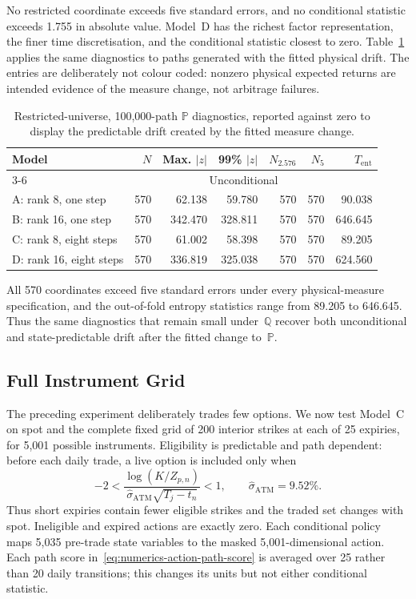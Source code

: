 \documentclass[11pt]{article}
\newcommand{\Q}{\mathbb Q}
\newcommand{\PP}{\mathbb P}
\newcommand{\abs}[1]{\lvert #1\rvert}
\theoremstyle{plain}
\theoremstyle{definition}
\theoremstyle{remark}
\begin{document}
No restricted coordinate exceeds five standard errors, and no conditional
statistic exceeds 1.755 in absolute value.  Model~D has the richest
factor representation, the finer time discretisation, and the conditional
statistic closest to zero.  Table~\ref{tab:numerics-restricted-p} applies the
same diagnostics to paths generated with the fitted physical drift.  The
entries are deliberately not colour coded: nonzero physical expected returns
are intended evidence of the measure change, not arbitrage failures.

\begin{table}[H]
\centering
\small
\begin{tabular}{lrrrrrr}
\toprule
Model & $N$ & Max. $\abs{z}$ & 99\% $\abs{z}$
  & $N_{2.576}$ & $N_5$ & $T_{\mathrm{ent}}$\\
\cmidrule(lr){3-6}
 & & \multicolumn{4}{c}{Unconditional} & \\
\midrule
A: rank 8, one step    & 570 & 62.138 & 59.780 & 570 & 570 & 90.038\\
B: rank 16, one step   & 570 & 342.470 & 328.811 & 570 & 570 & 646.645\\
C: rank 8, eight steps & 570 & 61.002 & 58.398 & 570 & 570 & 89.205\\
D: rank 16, eight steps& 570 & 336.819 & 325.038 & 570 & 570 & 624.560\\
\bottomrule
\end{tabular}
\caption{Restricted-universe, 100,000-path $\PP$ diagnostics, reported against
zero to display the predictable drift created by the fitted
measure change.}
\label{tab:numerics-restricted-p}
\end{table}

All 570 coordinates exceed five standard errors under every physical-measure
specification, and the out-of-fold entropy statistics range from 89.205 to
646.645.  Thus the same diagnostics that remain small under~$\Q$ recover both
unconditional and state-predictable drift after the fitted change to~$\PP$.

\subsection{Full Instrument Grid}
\label{sec:numerics-full-instrument-grid}

The preceding experiment deliberately trades few options.  We now test
Model~C on spot and the complete fixed grid of 200 interior strikes at each of
25 expiries, for 5,001 possible instruments.  Eligibility is predictable and
path dependent: before each daily trade, a live option is included only when
\[
  -2 < \frac{\log(K/Z_{p,n})}
  {\widehat\sigma_{\mathrm{ATM}}\sqrt{T_j-t_n}} < 1,
  \qquad \widehat\sigma_{\mathrm{ATM}}=9.52\%.
\]
Thus short expiries contain fewer eligible strikes and the traded set changes
with spot.  Ineligible and expired actions are exactly zero.  Each conditional
policy maps 5,035 pre-trade state variables to the masked 5,001-dimensional
action.  Each path score in~\eqref{eq:numerics-action-path-score} is averaged
over 25 rather than 20 daily transitions; this changes its units but not either
conditional statistic.
\end{document}
